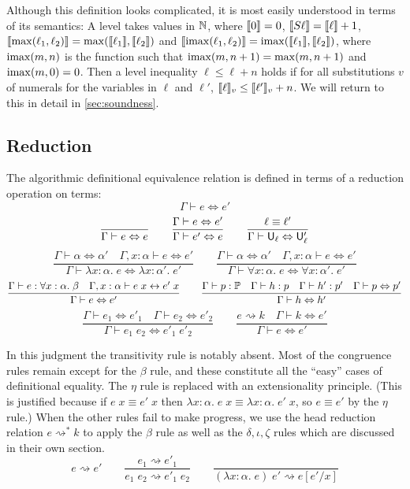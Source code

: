Although this definition looks complicated, it is most easily understood in terms of its semantics: A level takes values in $\mathbb{N}$, where $\llbracket 0\rrbracket=0$, $\llbracket S\ell\rrbracket=\llbracket \ell\rrbracket+1$, $\llbracket \max(\ell_1,\ell_2)\rrbracket=\max(\llbracket \ell_1\rrbracket,\llbracket \ell_2\rrbracket)$ and $\llbracket \operatorname{imax}(\ell_1,\ell_2)\rrbracket=\operatorname{imax}(\llbracket \ell_1\rrbracket,\llbracket \ell_2\rrbracket)$, where $\operatorname{imax}(m,n)$ is the function such that $\operatorname{imax}(m,n+1)=\max(m,n+1)$ and $\operatorname{imax}(m,0)=0$. Then a level inequality $\ell\le\ell+n$ holds if for all substitutions $v$ of numerals for the variables in $\ell$ and $\ell'$, $\llbracket \ell\rrbracket_v\le \llbracket \ell'\rrbracket_v+n$. We will return to this in detail in \autoref{sec:soundness}.

\subsection{Reduction}
The algorithmic definitional equivalence relation is defined in terms of a reduction operation on terms:
%
$$\boxed{\Gamma\vdash e\Leftrightarrow e'}$$
$$\frac{}{\Gamma\vdash e\Leftrightarrow e}\qquad
\frac{\Gamma\vdash e\Leftrightarrow e'}{\Gamma\vdash e'\Leftrightarrow e}\qquad
\frac{\ell\equiv\ell'}{\Gamma\vdash\U_\ell\Leftrightarrow\U_\ell'}$$
$$\frac{\Gamma\vdash\alpha\Leftrightarrow\alpha'\quad \Gamma,x:\alpha\vdash e\Leftrightarrow e'}{\Gamma\vdash\lambda x:\alpha.\;e\Leftrightarrow \lambda x:\alpha'.\;e'}\qquad
\frac{\Gamma\vdash\alpha\Leftrightarrow\alpha'\quad \Gamma,x:\alpha\vdash e\Leftrightarrow e'}{\Gamma\vdash\forall x:\alpha.\;e\Leftrightarrow \forall x:\alpha'.\;e'}$$
$$\frac{\Gamma\vdash e:\forall x:\alpha.\;\beta\quad\Gamma,x:\alpha\vdash e\;x\leftrightarrow e'\;x}{\Gamma\vdash e\Leftrightarrow e'}\qquad
\frac{\Gamma\vdash p:\P\quad \Gamma\vdash h:p\quad \Gamma\vdash h':p'\quad \Gamma \vdash p\Leftrightarrow p'}{\Gamma \vdash h\Leftrightarrow h'}$$
$$\frac{\Gamma\vdash e_1\Leftrightarrow e'_1\quad \Gamma\vdash e_2\Leftrightarrow e'_2}{\Gamma\vdash e_1\;e_2\Leftrightarrow e'_1\;e'_2}\qquad
\frac{e\rightsquigarrow k\quad \Gamma\vdash k\Leftrightarrow e'}{\Gamma\vdash e\Leftrightarrow e'}$$

In this judgment the transitivity rule is notably absent. Most of the congruence rules remain except for the $\beta$ rule, and these constitute all the ``easy'' cases of definitional equality. The $\eta$ rule is replaced with an extensionality principle. (This is justified because if $e\;x\equiv e'\;x$ then $\lambda x:\alpha.\;e\;x\equiv \lambda x:\alpha.\;e'\;x$, so $e\equiv e'$ by the $\eta$ rule.) When the other rules fail to make progress, we use the head reduction relation $e\rightsquigarrow^* k$ to apply the $\beta$ rule as well as the $\delta,\iota,\zeta$ rules which are discussed in their own section.
%
$$\boxed{e\rightsquigarrow e'}\qquad
\frac{e_1\rightsquigarrow e'_1}{e_1\;e_2\rightsquigarrow e'_1\;e_2}\qquad
\frac{}{(\lambda x:\alpha.\;e)\;e'\rightsquigarrow e[e'/x]}$$

